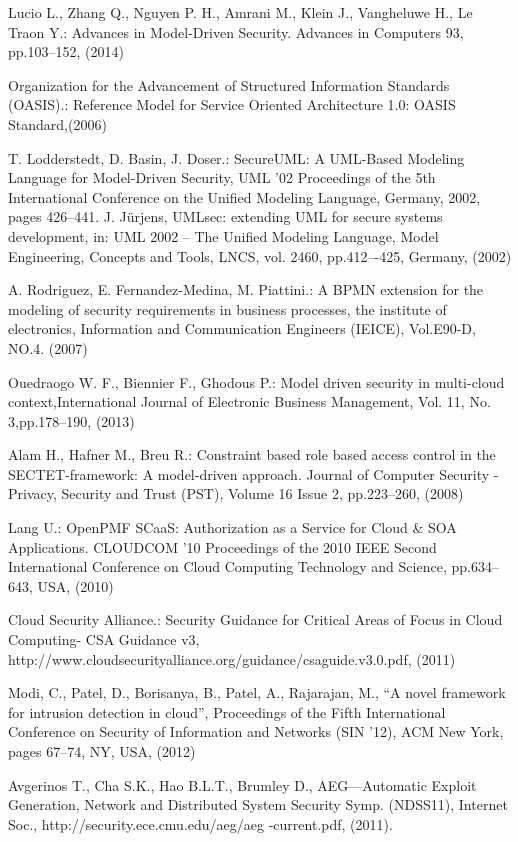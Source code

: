 \documentclass[runningheads,a4paper]{llncs}
\begin{document}
\begin{thebibliography}{4}
 Lucio L., Zhang Q., Nguyen P. H., Amrani M., Klein J., Vangheluwe H., Le Traon Y.: Advances in Model-Driven Security. Advances in Computers 93, pp.103--152, (2014)

 Organization for the Advancement of Structured Information Standards (OASIS).: Reference Model for Service Oriented Architecture 1.0: OASIS Standard,(2006)


 T. Lodderstedt, D. Basin, J. Doser.: SecureUML: A UML-Based Modeling Language for Model-Driven Security, UML '02 Proceedings of the 5th International Conference on the Unified Modeling Language,  Germany, 2002, pages 426--441.
 J. Jürjens, UMLsec: extending UML for secure systems development, in: UML 2002 – The Unified Modeling Language, Model Engineering, Concepts and Tools, LNCS, vol. 2460, pp.412–-425, Germany, (2002)
    
 A. Rodriguez, E. Fernandez-Medina, M. Piattini.: A BPMN extension for the modeling of security requirements in business processes, the institute of electronics, Information and Communication Engineers (IEICE), Vol.E90-D, NO.4. (2007)

 Ouedraogo W. F., Biennier F., Ghodous P.: Model driven security in multi-cloud context,International Journal of Electronic Business Management, Vol. 11, No. 3,pp.178--190, (2013)  


 Alam H., Hafner M.,	Breu R.: Constraint based role based access control in the SECTET-framework: A model-driven approach. Journal of Computer Security - Privacy, Security and Trust (PST), Volume 16 Issue 2, pp.223--260, (2008)

 Lang U.: OpenPMF SCaaS: Authorization as a Service for Cloud \& SOA Applications. CLOUDCOM '10 Proceedings of the 2010 IEEE Second International Conference on Cloud Computing Technology and Science, pp.634--643, USA, (2010) 

 Cloud Security Alliance.: Security Guidance for Critical Areas of Focus in Cloud Computing- CSA Guidance v3, http://www.cloudsecurityalliance.org/guidance/csaguide.v3.0.pdf, (2011)

 Modi, C., Patel, D., Borisanya, B., Patel, A., Rajarajan, M., “A novel framework for intrusion detection in cloud”, Proceedings of the Fifth International Conference on Security of Information and Networks (SIN '12), ACM New York, pages 67--74, NY, USA, (2012)

 Avgerinos T., Cha S.K., Hao B.L.T., Brumley D., AEG—Automatic Exploit Generation, Network and Distributed System Security Symp.
(NDSS11), Internet Soc., http://security.ece.cmu.edu/aeg/aeg
-current.pdf, (2011).
\end{thebibliography}
\end{document}
